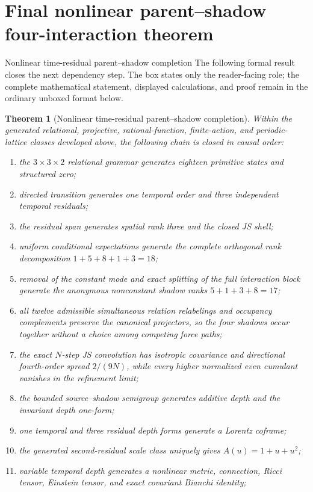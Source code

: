 \documentclass[11pt]{article}
\numberwithin{equation}{section}
\newtheorem{theorem}[definition]{Theorem}
\theoremstyle{remark}
\begin{document}
\section{Final nonlinear parent--shadow four-interaction theorem}
\label{sec:conclusion}
\begin{proofguide}{Nonlinear time-residual parent--shadow completion}
The following formal result closes the next dependency step. The box states only the reader-facing role; the complete mathematical statement, displayed calculations, and proof remain in the ordinary unboxed format below.
\end{proofguide}
\begin{theorem}[Nonlinear time-residual parent--shadow completion]
Within the generated relational, projective, rational-function, finite-action, and periodic-lattice classes developed above, the following chain is closed in causal order:
\begin{enumerate}
\item the $3\times3\times2$ relational grammar generates eighteen primitive states and structured zero;
\item directed transition generates one temporal order and three independent temporal residuals;
\item the residual span generates spatial rank three and the closed JS shell;
\item uniform conditional expectations generate the complete orthogonal rank decomposition $1+5+8+1+3=18$;
\item removal of the constant mode and exact splitting of the full interaction block generate the anonymous nonconstant shadow ranks $5+1+3+8=17$;
\item all twelve admissible simultaneous relation relabelings and occupancy complements preserve the canonical projectors, so the four shadows occur together without a choice among competing force paths;
\item the exact $N$-step JS convolution has isotropic covariance and directional fourth-order spread $2/(9N)$, while every higher normalized even cumulant vanishes in the refinement limit;
\item the bounded source--shadow semigroup generates additive depth and the invariant depth one-form;
\item one temporal and three residual depth forms generate a Lorentz coframe;
\item the generated second-residual scale class uniquely gives $A(u)=1+u+u^2$;
\item variable temporal depth generates a nonlinear metric, connection, Ricci tensor, Einstein tensor, and exact covariant Bianchi identity;

\end{enumerate}
\end{theorem}
\end{document}
